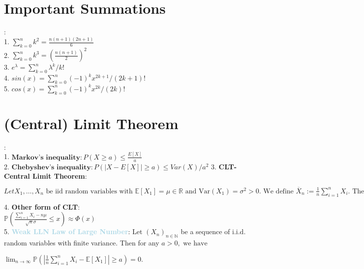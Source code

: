 \documentclass[twocolumn]{article}
\newcommand{\method}[1]{\textbf{\textcolor{lightblue}{#1}}}
\newcommand{\sectionspace}{\vspace*{1em}}
\newcommand{\sectionspaceLARGE}{\vspace*{10em}}
\begin{document}
\sectionspace

\section{Important Summations}
:\\
1. $\sum_{k=0}^{n} k^2 = \frac{n(n+1)(2n+1)}{6}$\\
2. $\sum_{k=0}^{n} k^3 = \left(\frac{n(n+1)}{2}\right)^2$\\
3. $e^\lambda = \sum_{k=0}^{n} \lambda^k/k!$\\
4. $sin(x) = \sum_{k=0}^{n} (-1)^k x^{2k+1}/(2k+1)!$\\
5. $cos(x) = \sum_{k=0}^{n} (-1)^k x^{2k}/(2k)!$

\sectionspace
\sectionspaceLARGE
\sectionspace
\sectionspace
\sectionspace
\sectionspace



\section{(Central) Limit Theorem}
:\\
1. $\textbf{Markov's inequality}: P(X \geq a) \leq \frac{E[X]}{a}$\\
2. $\textbf{Chebyshev's inequality}: P(|X - E[X]| \geq a) \leq Var(X)/a^2$
3. \textbf{CLT- Central Limit Theorem}:\\
$Let X_1, \ldots, X_n \text{ be iid random variables with } \mathbb{E}[X_1] = \mu \in \mathbb{R} \text{ and } \text{Var}(X_1) = \sigma^2 > 0. \text{ We define }
\overline{X}_n := \frac{1}{n} \sum_{i=1}^n X_i. \text{ Then}
\mathbb{P}\left( \frac{\overline{X}_n - \mathbb{E}[\overline{X}_n]}{\sqrt{\text{Var}(\overline{X}_n)}} \leq x \right) 
\xrightarrow{n \to \infty} \Phi(x).$\\
4. \textbf{Other form of CLT}:\\
$\mathbb{P}\left( \frac{\sum_{i=1}^n X_i - n\mu}{\sqrt{n}\sigma} \leq x \right) \approx \Phi(x)$\\
5. \method{Weak LLN Law of Large Number}: $ \text{Let } (X_n)_{n \in \mathbb{N}} $ be a sequence of i.i.d. random variables with finite variance. Then for any $ a > 0, \text{ we have} $

$ \lim_{n \to \infty} \mathbb{P} \left( \left| \frac{1}{n} \sum_{i=1}^n X_i - \mathbb{E}[X_1] \right| \geq a \right) = 0. $



\sectionspace
\end{document}
